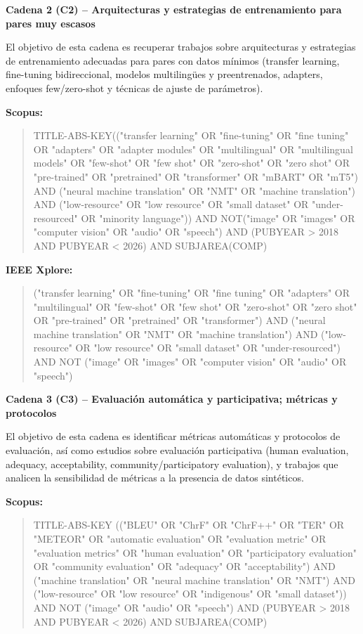 \documentclass[12pt,a4paper,oneside]{book}
\begin{document}
\textbf{Cadena 2 (C2) -- Arquitecturas y estrategias de entrenamiento para pares muy escasos}

El objetivo de esta cadena es recuperar trabajos sobre arquitecturas y estrategias de entrenamiento adecuadas para pares con datos mínimos (transfer learning, fine-tuning bidireccional, modelos multilingües y preentrenados, adapters, enfoques few/zero-shot y técnicas de ajuste de parámetros).

\noindent\textbf{Scopus:}
\begin{quote}\small\sloppy
TITLE-ABS-KEY(("transfer learning" OR "fine-tuning" OR "fine tuning" OR "adapters" OR "adapter modules" OR "multilingual" OR "multilingual models" OR "few-shot" OR "few shot" OR "zero-shot" OR "zero shot" OR "pre-trained" OR "pretrained" OR "transformer" OR "mBART" OR "mT5") AND ("neural machine translation" OR "NMT" OR "machine translation") AND ("low-resource" OR "low resource" OR "small dataset" OR "under-resourced" OR "minority language")) AND NOT("image" OR "images" OR "computer vision" OR "audio" OR "speech") AND (PUBYEAR \textgreater{} 2018 AND PUBYEAR \textless{} 2026) AND SUBJAREA(COMP)
\end{quote}

\noindent\textbf{IEEE Xplore:}
\begin{quote}\small\sloppy
("transfer learning" OR "fine-tuning" OR "fine tuning" OR "adapters" OR "multilingual" OR "few-shot" OR "few shot" OR "zero-shot" OR "zero shot" OR "pre-trained" OR "pretrained" OR "transformer") AND ("neural machine translation" OR "NMT" OR "machine translation") AND ("low-resource" OR "low resource" OR "small dataset" OR "under-resourced") AND NOT ("image" OR "images" OR "computer vision" OR "audio" OR "speech")
\end{quote}

\textbf{Cadena 3 (C3) -- Evaluación automática y participativa; métricas y protocolos}

El objetivo de esta cadena es identificar métricas automáticas y protocolos de evaluación, así como estudios sobre evaluación participativa (human evaluation, adequacy, acceptability, community/participatory evaluation), y trabajos que analicen la sensibilidad de métricas a la presencia de datos sintéticos.

\noindent\textbf{Scopus:}
\begin{quote}\small\sloppy
TITLE-ABS-KEY (("BLEU" OR "ChrF" OR "ChrF++" OR "TER" OR "METEOR" OR "automatic evaluation" OR "evaluation metric" OR "evaluation metrics" OR "human evaluation" OR "participatory evaluation" OR "community evaluation" OR "adequacy" OR "acceptability") AND ("machine translation" OR "neural machine translation" OR "NMT") AND ("low-resource" OR "low resource" OR "indigenous" OR "small dataset")) AND NOT ("image" OR "audio" OR "speech") AND (PUBYEAR \textgreater{} 2018 AND PUBYEAR \textless{} 2026) AND SUBJAREA(COMP)
\end{quote}
\end{document}
